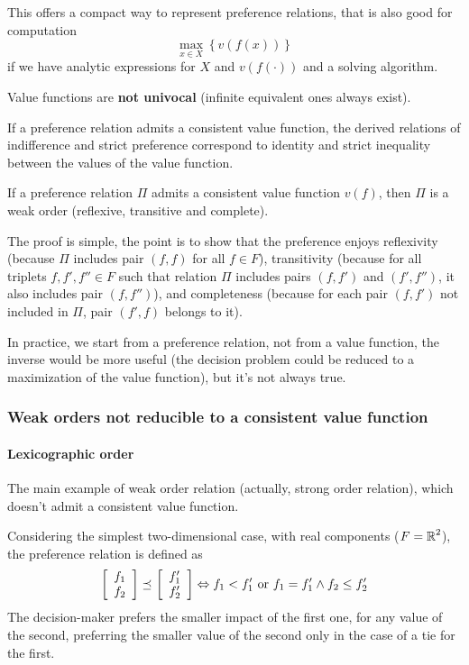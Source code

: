This offers a compact way to represent preference relations, that is also good for computation
$$ \max_{x \in X} \left\{ v\left(f(x)\right) \right\}$$
if we have analytic expressions for $X$ and $v\left( f (\cdot)\right)$ and a solving algorithm.

Value functions are \textbf{not univocal} (infinite equivalent ones always exist).

If a preference relation admits a consistent value function, the derived relations of indifference and strict preference correspond to identity and strict inequality between the values of the value function. \\

\begin{theo}
	If a preference relation $\Pi$ admits a consistent value function $v(f)$, then $\Pi$ is a weak order (reflexive, transitive and complete).
\end{theo}

The proof is simple, the point is to show that the preference enjoys reflexivity (because $\Pi$ includes pair $(f,f)$ for all $f \in F$), transitivity (because for all triplets $f, f', f'' \in F$ such that relation $\Pi$ includes pairs $(f,f')$ and $(f', f'')$, it also includes pair $(f, f'')$), and completeness (because for each pair $(f, f')$ not included in $\Pi$, pair $(f',f)$ belongs to it).

In practice, we start from a preference relation, not from a value function, the inverse would be more useful (the decision problem could be reduced to a maximization of the value function), but it's not always true.

\subsubsection{Weak orders not reducible to a consistent value function}

\paragraph{Lexicographic order} The main example of weak order relation (actually, strong order relation), which doesn't admit a consistent value function. 

Considering the simplest two-dimensional case, with real components ($F = \operatorname{\mathbb{R}}^2$), the preference relation is defined as
$$ 
\left[
\begin{array}{c}
	f_1 \\
	f_2
\end{array}
\right] \preceq_{}  \left[
\begin{array}{c}
	f_1' \\
	f_2'
\end{array}
\right]
\Leftrightarrow f_1 < f_1' \text{ or } f_1 = f_1' \wedge f_2 \leq f_2'
$$
The decision-maker prefers the smaller impact of the first one, for any value of the second, preferring the smaller value of the second only in the case of a tie for the first.

